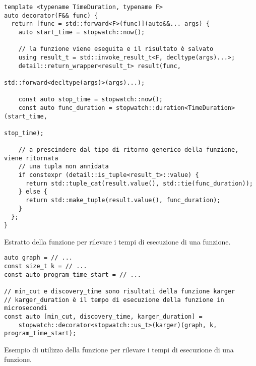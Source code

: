 \begin{listing}[!ht]
\begin{verbatim}
template <typename TimeDuration, typename F>
auto decorator(F&& func) {
  return [func = std::forward<F>(func)](auto&&... args) {
    auto start_time = stopwatch::now();
    
    // la funzione viene eseguita e il risultato è salvato
    using result_t = std::invoke_result_t<F, decltype(args)...>;
    detail::return_wrapper<result_t> result(func,
                                            std::forward<decltype(args)>(args)...);

    const auto stop_time = stopwatch::now();
    const auto func_duration = stopwatch::duration<TimeDuration>(start_time,
                                                                 stop_time);

    // a prescindere dal tipo di ritorno generico della funzione, viene ritornata
    // una tupla non annidata
    if constexpr (detail::is_tuple<result_t>::value) {
      return std::tuple_cat(result.value(), std::tie(func_duration));
    } else {
      return std::make_tuple(result.value(), func_duration);
    }
  };
}
\end{verbatim}
\caption{Estratto della funzione  per rilevare i tempi di esecuzione di una funzione.}
\label{listings:stopwatch-decorator}
\end{listing}


\begin{listing}[!ht]
\begin{verbatim}
auto graph = // ...
const size_t k = // ...
const auto program_time_start = // ...

// min_cut e discovery_time sono risultati della funzione karger
// karger_duration è il tempo di esecuzione della funzione in microsecondi
const auto [min_cut, discovery_time, karger_duration] =
    stopwatch::decorator<stopwatch::us_t>(karger)(graph, k, program_time_start);

\end{verbatim}
\caption{Esempio di utilizzo della funzione  per rilevare i tempi di esecuzione di una funzione.}
\label{listings:stopwatch-decorator-usage}
\end{listing}